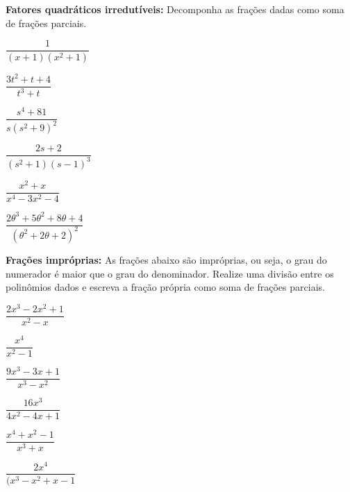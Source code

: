 \begin{secExercicios}
\begin{exer}
        \textbf{Fatores quadráticos irredutíveis:} Decomponha as frações dadas como soma de frações parciais.
        \begin{enumerate}[a)]
        \begin{multicols}{2}
            \item $\dfrac{1}{(x+1)(x^2 + 1)}$
            \item $\dfrac{3t^2 + t + 4}{t^3 + t}$
            \item $\dfrac{s^4 + 81}{s(s^2 + 9)^2}$
            \item $\dfrac{2s + 2}{(s^2 + 1)(s-1)^3}$
            \item $\dfrac{x^2 + x}{x^4 - 3x^2 - 4}$
            \item $\dfrac{2 \theta^3 + 5 \theta^2 + 8\theta + 4}{(\theta^2 + 2\theta + 2)^2}$
        \end{multicols}
        \end{enumerate}
    \end{exer}

\begin{exer}
        \textbf{Frações impróprias:} As frações abaixo são impróprias, ou seja, o grau do numerador é maior que o grau do denominador. Realize uma divisão entre os polinômios dados e escreva a fração própria como soma de frações parciais.
        \begin{enumerate}[a)]
        \begin{multicols}{2}
            \item $\dfrac{2x^3 - 2x^2 + 1}{x^2 - x}$
            \item $\dfrac{x^4}{x^2 -1}$
            \item $\dfrac{9x^3 - 3x + 1}{x^3 - x^2}$
            \item $\dfrac{16x^3}{4x^2 - 4x + 1}$
            \item $\dfrac{x^4 + x^2 - 1}{x^3 + x}$
            \item $\dfrac{2x^4}{(x^3 - x^2 + x - 1}$
        \end{multicols}
        \end{enumerate}
    \end{exer}



   



\end{secExercicios}



